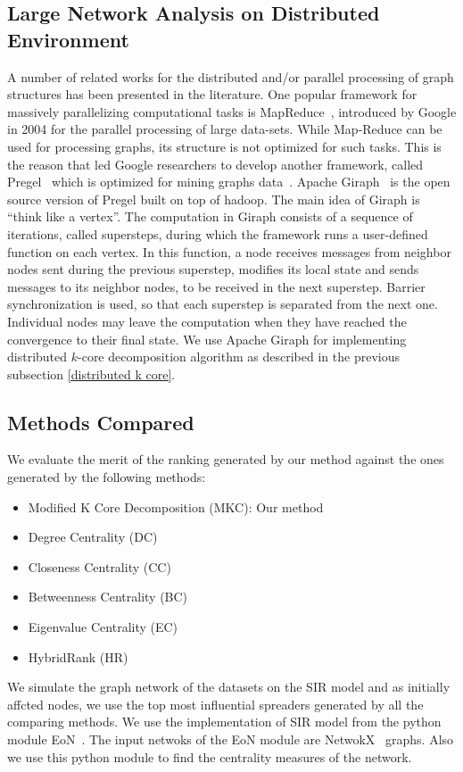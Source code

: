 \documentclass[sigconf]{acmart}
\begin{document}
\subsection{Large Network Analysis on Distributed Environment}
A number of related works for the distributed and/or parallel processing of graph structures has been presented in the literature. One popular framework for massively parallelizing
computational tasks is MapReduce~\cite{dean2008mapreduce}, introduced by Google in 2004 for the parallel processing of large data-sets. While Map-Reduce can be used for processing graphs, its structure is not optimized for such tasks. This is the reason that led Google researchers to develop another framework, called Pregel~\cite{malewicz2010pregel} which is optimized for mining graphs data~\cite{han2014experimental}. Apache Giraph~\cite{martella2012apache,martella2015practical} is the open source version of Pregel built on top of hadoop. The main idea of Giraph is ``think like a vertex''. The computation in Giraph consists of a sequence of iterations, called supersteps, during which the framework runs a user-defined function on each vertex. In this function, a node receives messages from neighbor nodes sent during the previous superstep, modifies its local state and sends messages to its neighbor nodes, to be received in the next superstep. Barrier synchronization is used, so that each superstep is separated from the next one. Individual nodes may leave the computation when they have reached the convergence to their final state.
We use Apache Giraph for implementing distributed $k$-core decomposition algorithm as described in the previous subsection \ref{distributed k core}.


\subsection{Methods Compared}
We  evaluate the merit of the ranking generated by our method against the ones generated by the following methods: 
\begin{itemize}
	\item Modified K Core Decomposition (MKC): Our method
	\item Degree Centrality (DC)
	\item Closeness Centrality (CC)
	\item Betweenness Centrality (BC)
	\item Eigenvalue Centrality (EC)
	\item HybridRank (HR)
\end{itemize}
We simulate the graph network of the datasets on the SIR model and as initially affcted nodes, we use 
the top most influential spreaders generated by all the comparing methods. We use the implementation of SIR model from the python module EoN~\cite{eon}. The input netwoks of the EoN module are NetwokX~\cite{networkx} graphs. Also we use this python module to find the centrality measures of the network. 
\end{document}
